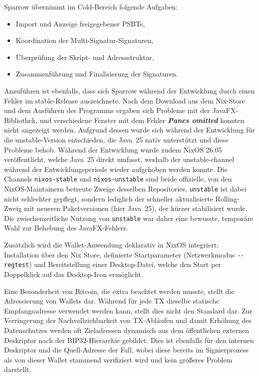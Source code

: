 Sparrow übernimmt im Cold-Bereich folgende Aufgaben:
\begin{itemize}
  \item Import und Anzeige freigegebener \acp{PSBT},
  \item Koordination der Multi-Signatur-Signaturen,
  \item Überprüfung der Skript- und Adressstruktur,
  \item Zusammenführung und Finalisierung der Signaturen.
\end{itemize}

Anzuführen ist ebenfalls, dass sich Sparrow während der Entwicklung durch einen Fehler im stable-Release auszeichnete. Nach dem Download aus dem Nix-Store und dem Ausführen des Programms ergaben sich Probleme mit der JavaFX-Bibliothek, und verschiedene Fenster mit dem Fehler \emph{\textbf{Panes omitted}} konnten nicht angezeigt werden.
Aufgrund dessen wurde sich während der Entwicklung für die unstable-Version entschieden, die Java~25 nativ unterstützt und diese Probleme behob. Während der Entwicklung wurde zudem NixOS 26.05 veröffentlicht, welche Java~25 direkt umfasst, weshalb der unstable-channel während der Entwicklungsperiode wieder aufgehoben werden konnte.
Die Channels \texttt{nixos-stable} und \texttt{nixos-unstable} sind beide offizielle, von den NixOS-Maintainern betreute Zweige desselben Repositories. \texttt{unstable} ist dabei nicht schlechter gepflegt, sondern lediglich der schneller aktualisierte Rolling-Zweig mit neueren Paketversionen (hier Java~25), der kürzer stabilisiert wurde. Die zwischenzeitliche Nutzung von \texttt{unstable} war daher eine bewusste, temporäre Wahl zur Behebung des JavaFX-Fehlers.

Zusätzlich wird die Wallet-Anwendung deklarativ in NixOS integriert: Installation über den Nix Store, definierte Startparameter (Netzwerkmodus \texttt{-{}-regtest}) und Bereitstellung einer Desktop-Datei, welche den Start per Doppelklick auf das Desktop-Icon ermöglicht.

\label{sec:dyn_adress}
Eine Besonderheit von Bitcoin, die extra beachtet werden musste, stellt die Adressierung von Wallets dar.
Während für jede \ac{TX} dieselbe statische Empfangsadresse verwendet werden kann, stellt dies nicht den Standard dar.
Zur Verringerung der Nachvollziehbarkeit von \ac{TX}-Abläufen und damit Erhöhung des Datenschutzes werden oft Zieladressen dynamisch aus dem öffentlichen externen Deskriptor nach der \ac{BIP}32-Hierarchie gebildet.
Dies ist ebenfalls für den internen Deskriptor und die Quell-Adresse der Fall, wobei diese bereits im Signierprozess als von dieser Wallet stammend verifiziert wird und kein größeres Problem darstellt.

